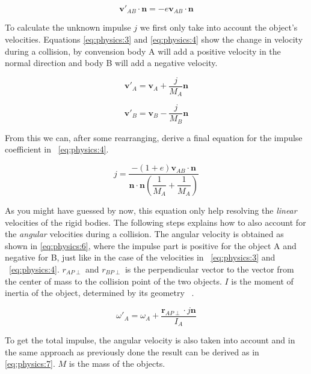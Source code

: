\documentclass[a4paper,12pt]{report}
\begin{document}
\begin{equation}
\mathbf v'_{AB}\cdot \mathbf n=-e\mathbf v_{AB}\cdot \mathbf n
\label{eq:physics:2}
\end{equation}

To calculate the unknown impulse $j$ we first only take into account the object's velocities. Equations \ref{eq:physics:3} and \ref{eq:physics:4} show the change in velocity during a collision, by convension body A will add a positive velocity in the normal direction and body B will add a negative velocity.

\begin{equation}
\mathbf v'_{A}=\mathbf v_{A}+\dfrac{j}{M_{A}}\mathbf n
\label{eq:physics:3}
\end{equation}

\begin{equation}
\mathbf v'_{B}=\mathbf v_{B}-\dfrac{j}{M_{B}}\mathbf n
\label{eq:physics:4}
\end{equation}

From this we can, after some rearranging, derive a final equation for the impulse coefficient in ~\ref{eq:physics:4}.

\begin{equation}
j = \dfrac{ -(1+e) \mathbf v_{AB} \cdot \mathbf n }{
    \mathbf n \cdot \mathbf n ( \dfrac{1}{M_{A}} + \dfrac{1}{M_{A}} )}
\label{eq:physics:5}
\end{equation}

As you might have guessed by now, this equation only help resolving the \emph{linear} velocities of the rigid bodies. The following steps explains how to also account for the \emph{angular} velocities during a collision. The angular velocity is obtained as shown in \ref{eq:physics:6}, where the impulse part is positive for the object A and negative for B, just like in the case of the velocities in ~\ref{eq:physics:3} and ~\ref{eq:physics:4}. $r_{AP\perp}$ and $r_{BP\perp}$ is the perpendicular vector to the vector from the center of mass to the collision point of the two objects. $I$ is the moment of inertia of the object, determined by its geometry ~\cite{moi}.

\begin{equation}
\omega'_{A}=\omega_{A}+\dfrac{\mathbf r_{AP\perp}\cdot j\mathbf n}{I_{A}}
\label{eq:physics:6}
\end{equation}

To get the total impulse, the angular velocity is also taken into account and in the same approach as previously done the result can be derived as in \ref{eq:physics:7}. $M$ is the mass of the objects.
\end{document}
